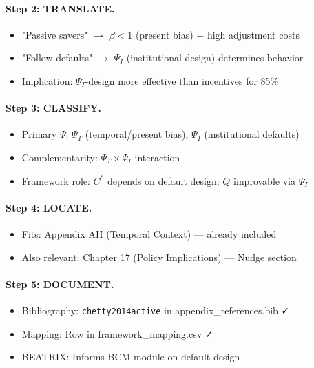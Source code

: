 \paragraph{Step 2: TRANSLATE.}
\begin{itemize}
  \item "Passive savers" $\to$ $\beta < 1$ (present bias) + high adjustment costs
  \item "Follow defaults" $\to$ $\Psi_I$ (institutional design) determines behavior
  \item Implication: $\Psi_I$-design more effective than incentives for 85\%
\end{itemize}

\paragraph{Step 3: CLASSIFY.}
\begin{itemize}
  \item Primary $\Psi$: $\Psi_T$ (temporal/present bias), $\Psi_I$ (institutional defaults)
  \item Complementarity: $\Psi_T \times \Psi_I$ interaction
  \item Framework role: $C^*$ depends on default design; $Q$ improvable via $\Psi_I$
\end{itemize}

\paragraph{Step 4: LOCATE.}
\begin{itemize}
  \item Fits: Appendix AH (Temporal Context) --- already included
  \item Also relevant: Chapter 17 (Policy Implications) --- Nudge section
\end{itemize}

\paragraph{Step 5: DOCUMENT.}
\begin{itemize}
  \item Bibliography: \texttt{chetty2014active} in appendix\_references.bib ✓
  \item Mapping: Row in framework\_mapping.csv ✓
  \item BEATRIX: Informs BCM module on default design
\end{itemize}

